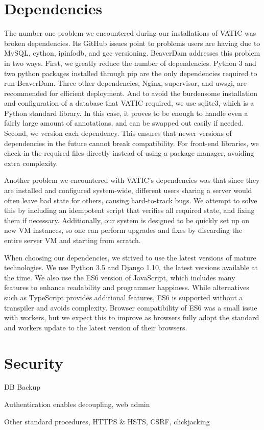 \section{Dependencies}

The number one problem we encountered during our installations of VATIC was broken dependencies. 
Its GitHub issues point to problems users are having due to MySQL, cython, ipinfodb, and gcc versioning.
BeaverDam addresses this problem in two ways. 
First, we greatly reduce the number of dependencies.
Python 3 and two python packages installed through pip are the only dependencies required to run BeaverDam.
Three other dependencies, Nginx, supervisor, and uwsgi, are recommended for efficient deployment.
And to avoid the burdensome installation and configuration of a database that VATIC required, we use sqlite3, which is a Python standard library. 
In this case, it proves to be enough to handle even a fairly large amount of annotations, and can be swapped out easily if needed.
Second, we version each dependency. 
This ensures that newer versions of dependencies in the future cannot break compatibility. 
For front-end libraries, we check-in the required files directly instead of using a package manager, avoiding extra complexity.

Another problem we encountered with VATIC's dependencies was that since they are installed and configured system-wide, 
different users sharing a server would often leave bad state for others, causing hard-to-track bugs.
We attempt to solve this by including an idempotent script that verifies all required state, and fixing them if necessary.
Additionally, our system is designed to be quickly set up on new VM instances, 
so one can perform upgrades and fixes by discarding the entire server VM and starting from scratch.

When choosing our dependencies, we strived to use the latest versions of mature technologies.
We use Python 3.5 and Django 1.10, the latest versions available at the time.
We also use the ES6 version of JavaScript, which includes many features to enhance readability and programmer happiness.
While alternatives such as TypeScript provides additional features, ES6 is supported without a transpiler and avoids complexity.
Browser compatibility of ES6 was a small issue with workers, but we expect this to improve as browsers fully adopt the standard and workers update to the latest version of their browsers. 

\section{Security}

DB Backup

Authentication enables decoupling, web admin

Other standard procedures, HTTPS \& HSTS, CSRF, clickjacking


